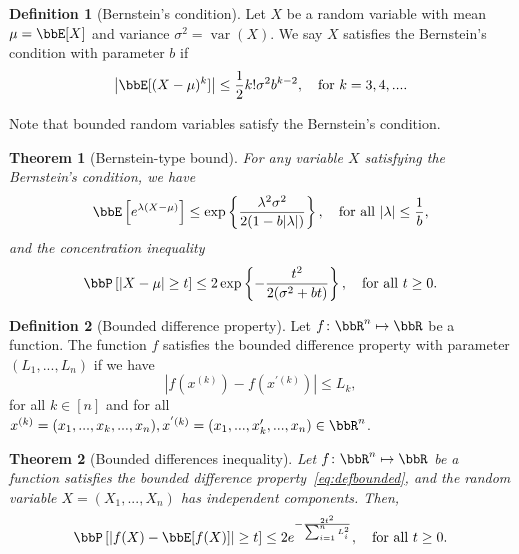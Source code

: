 \documentclass[11pt]{article}
\DeclareMathOperator{\var}{var}
\newcommand{\off}[1]{\left[#1\right]}
\newcommand{\aabs}[1]{\left|#1\right|}
\theoremstyle{plain}
\newtheorem{thm}{Theorem}[section]
\theoremstyle{definition}
\newtheorem{defn}{Definition}
\begin{document}
\begin{defn}[Bernstein's condition]
Let $X$ be a random variable with mean $\mu = \bbE[X]$ and variance $ \sigma^2 = \var(X)$. We say $X$ satisfies the Bernstein's condition with parameter $b$ if
\begin{equation}\label{eq:berncond}
	\left| \bbE [(X -\mu)^k ]\right| \leq \frac{1}{2} k! \sigma^2 b^{k-2}, \quad \text{for } k =3, 4,....
\end{equation} 
\end{defn}
Note that bounded random variables satisfy the Bernstein's condition.

\begin{thm}[Bernstein-type bound] For any variable $X$ satisfying the Bernstein's condition, we have
\begin{equation}
	\bbE\left[e^{\lambda (X-\mu)}\right] \leq \exp\left\{ \frac{\lambda^2 \sigma^2}{2(1 - b |\lambda|)} \right\},\quad \text{for all } |\lambda| \leq \frac{1}{b}, 
\end{equation}
and the concentration inequality
\begin{equation}\label{eq:thmbernconc}
	\bbP\left[|X - \mu| \geq t\right] \leq 2 \exp \left\{ -\frac{t^2}{2(\sigma^2 + bt)} \right\}, \quad \text{for all }t \geq 0.
\end{equation}
	
\end{thm}

\begin{defn}[Bounded difference property] Let $f\colon \bbR^n \mapsto \bbR$ be a function. The function $f$ satisfies the bounded difference property with parameter $(L_1,...,L_n)$ if we have
	\begin{equation}\label{eq:defbounded}
		\aabs{f(x^{(k)}) - f(x^{'(k)})} \leq L_k,
	\end{equation}
	 for all $k \in [n]$ and for all $x^{(k)} = (x_1,...,x_k,...,x_n), x^{'(k)} = (x_1,...,x'_k,...,x_n)\in\bbR^n$.
\end{defn}



\begin{thm}[Bounded differences inequality] \label{thm:bounddiff}
Let $f\colon \bbR^n \mapsto \bbR$ be a function satisfies the bounded difference property~\eqref{eq:defbounded}, and the random variable $X = (X_1,...,X_n)$ has independent components. Then,
\begin{equation}
	\bbP\off{\aabs{f(X) -\bbE[f(X)] } \geq t} \leq 2 e^{-\frac{2t^2}{\sum_{i=1}^n L_i^2}}, \quad \text{for all }t \geq 0.
\end{equation}

	
\end{thm}
\end{document}
